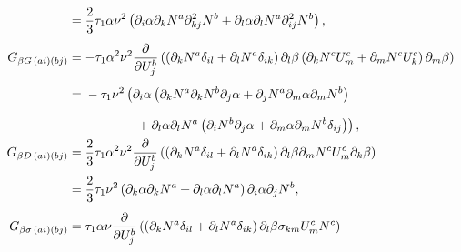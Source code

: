 \begin{align}
                               & = \vphantom{\frac{\partial }{\partial U_j^b}}\frac{2}{3} \tau_1 \alpha \nu^2 \left( \partial_i \alpha \partial_k N^a \partial_{kj}^2 N^b + \partial_l \alpha \partial_l N^a \partial_{ij}^2 N^b \right), \label{eq:GBetaCLHSStabilizationTerm}                                                                                                                                         \\
  G_{\beta G \, (ai)(bj)}      & = - \tau_1 \alpha^2 \nu^2 \frac{\partial }{\partial U_j^b} \left( \left( \partial_k N^a \delta_{il} + \partial_l N^a \delta_{ik} \right) \partial_l \beta \left( \partial_k N^c U_m^c + \partial_m N^c U_k^c \right) \partial_m \beta \right) \notag                                                                                                                                   \\
                               & =\vphantom{\frac{\partial }{\partial U_j^b}} - \tau_1 \nu^2 \left( \partial_i \alpha \left( \partial_k N^a \partial_k N^b \partial_j \alpha + \partial_j N^a \partial_m \alpha \partial_m N^b \right) \right. \notag \\
                               & \hphantom{{}={} - \tau_1 \nu^2 \Bigl(}\left. {}+ \partial_l \alpha \partial_l N^a \left( \partial_i N^b \partial_j \alpha + \partial_m \alpha \partial_m N^b \delta_{ij} \right) \right), \label{eq:GBetaGLHSStabilizationTerm} \\
  G_{\beta D \, (ai)(bj)}      & = \frac{2}{3} \tau_1 \alpha^2 \nu^2 \frac{\partial }{\partial U_j^b} \left( \left( \partial_k N^a \delta_{il} + \partial_l N^a \delta_{ik} \right) \partial_l \beta \partial_m N^c U_m^c \partial_k \beta \right) \notag                                                                                                                                                               \\
                               & = \vphantom{\frac{\partial }{\partial U_j^b}} \frac{2}{3} \tau_1 \nu^2 \left( \partial_k \alpha \partial_k N^a + \partial_l \alpha \partial_l N^a \right) \partial_i \alpha \partial_j N^b, \label{eq:GBetaDLHSStabilizationTerm}                                                                                                                                                      \\
  G_{\beta \sigma \, (ai)(bj)} & = \tau_1 \alpha \nu \frac{\partial }{\partial U_j^b} \left( \left( \partial_k N^a \delta_{il} + \partial_l N^a \delta_{ik} \right) \partial_l \beta \sigma_{km} U_m^c N^c \right)  \notag                                                                                                                                                                                              \\

\end{align}
